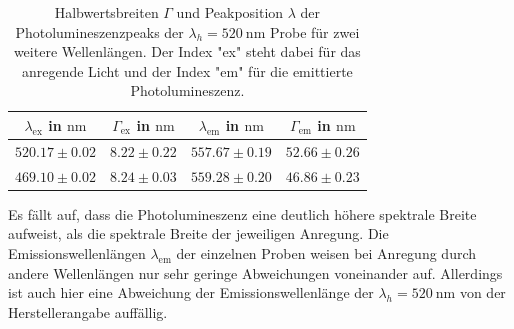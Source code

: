 \begin{table}[H]
  \centering
  \caption{Halbwertsbreiten $\Gamma$ und Peakposition $\lambda$ der Photolumineszenzpeaks der $\lambda_h = \SI{520}{\nano\meter}$ Probe für zwei weitere Wellenlängen. Der Index "ex" steht dabei für das anregende Licht und der Index "em" für die emittierte Photolumineszenz.}
  \label{tab:weisslicht3}
\begin{tabular}{c|c|c|c}
  \toprule
     $\lambda_{\text{ex}}$ in $\si{\nano\meter}$ & $\Gamma_{\text{ex}}$ in $\si{\nano\meter}$ & $\lambda_{\text{em}}$ in $\si{\nano\meter}$ & $\Gamma_{\text{em}}$ in $\si{\nano\meter}$ \\
     \midrule
     $520.17 \pm 0.02$ & $8.22 \pm 0.22 $ & $557.67 \pm 0.19 $ & $52.66 \pm 0.26$ \\
     $469.10 \pm 0.02 $ & $ 8.24 \pm 0.03 $ & $ 559.28 \pm 0.20 $ & $46.86 \pm 0.23$ \\
  \bottomrule
\end{tabular}
\end{table}
Es fällt auf, dass die Photolumineszenz eine deutlich höhere spektrale Breite aufweist, als die spektrale Breite der jeweiligen Anregung. Die Emissionswellenlängen $\lambda_{\text{em}}$ der einzelnen Proben weisen bei Anregung durch andere Wellenlängen nur sehr geringe Abweichungen voneinander auf. Allerdings ist auch hier eine Abweichung der Emissionswellenlänge der $\lambda_h = \SI{520}{\nano\meter}$ von der Herstellerangabe auffällig.
